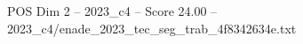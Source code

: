 \begin{textsample}{POS Dim 2 – 2023\_c4 – Score 24.00 – 2023\_c4/enade\_2023\_tec\_seg\_trab\_4f8342634e.txt}
\end{textsample}
